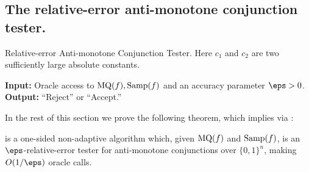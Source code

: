 \documentclass[11pt]{article}
\theoremstyle{definition}
\begin{document}
\subsection{The relative-error anti-monotone conjunction tester. }
\label{sec:conj-algorithm}

\begin{algorithm}[t!] 
\caption{Relative-error Anti-monotone Conjunction Tester. 
{Here $c_1$ and $c_2$ are two\\ sufficiently large absolute constants. } }

\label{algo: mono conjunction tester}



\vspace{0.15cm}\textbf{Input: } Oracle access to $\mathrm{MQ}(f), \mathrm{Samp}(f)$ and an accuracy parameter $\eps > 0$. \\
\textbf{Output: } ``Reject'' or ``Accept.''

\end{algorithm}







In the rest of this section we prove the following theorem, which implies 
 via :

\begin{theorem}  \label{thm:acceptable-monotone}
 is a one-sided non-adaptive
algorithm which, given $\mathrm{MQ}(f)$ and $\mathrm{Samp}(f)$,
is an $\eps$-relative-error tester for anti-monotone conjunctions over $\{0,1\}^n$, making $O(1/\eps)$ oracle calls.
\end{theorem}
\end{document}

